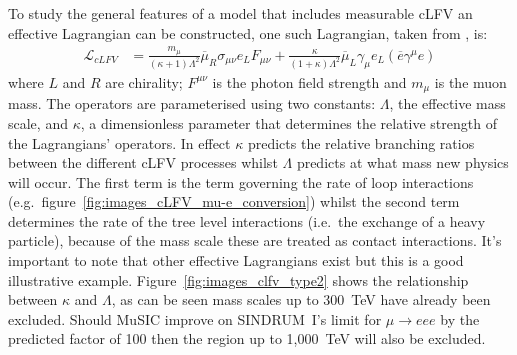 To study the general features of a model that includes measurable cLFV an effective Lagrangian can be constructed, one such Lagrangian, taken from \cite{effective_lagrangian_for_clfv}, is:
\begin{align}
  \mathcal{L}_{cLFV} &= 
      \frac{m_{\mu}}{(\kappa + 1)\Lambda^2}
      \overline{\mu}_R\sigma_{\mu\nu}e_L F_{\mu\nu} + 
      \frac{\kappa}{(1+\kappa)\Lambda^2}
      \overline{\mu}_L\gamma_{\mu}e_L
      (\overline{e}\gamma^{\mu}e) \label{equ:type2}
\end{align}
where \(L\) and \(R\) are chirality; \(F^{\mu\nu}\) is the photon field strength and \( m_{\mu} \) is the muon mass. The operators are parameterised using two constants: \(\Lambda\), the effective mass scale, and \(\kappa\), a dimensionless parameter that determines the relative strength of the Lagrangians' operators. In effect \(\kappa\) predicts the relative branching ratios between the different cLFV processes whilst \(\Lambda\) predicts at what mass new physics will occur. The first term is the term governing the rate of loop interactions (e.g.\ figure~\ref{fig:images_cLFV_mu-e_conversion}) whilst the second term determines the rate of the tree level interactions (i.e.\ the exchange of a heavy particle), because of the mass scale these are treated as contact interactions. It's important to note that other effective Lagrangians exist but this is a good illustrative example. Figure~\ref{fig:images_clfv_type2} shows the relationship between \(\kappa\) and \(\Lambda\), as can be seen mass scales up to 300~TeV have already been excluded. Should MuSIC improve on SINDRUM~I's limit for \( \mu\rightarrow eee \) by the predicted factor of 100 then the region up to 1,000~TeV will also be excluded.

